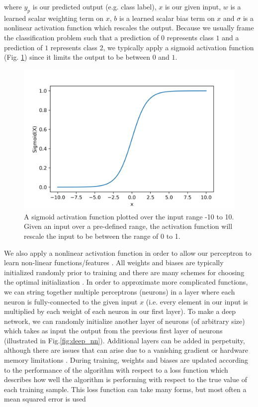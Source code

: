 where $y_{p}$ is our predicted output (e.g. class label), $x$ is our given input, $w$ is a learned scalar weighting term on $x$, $b$ is a learned scalar bias term on $x$ and $\sigma$ is a nonlinear activation function which rescales the output. Because we usually frame the classification problem such that a prediction of $0$ represents class $1$ and a prediction of $1$ represents class $2$, we typically apply a sigmoid activation function (Fig. \ref{fig:sigmoid}) since it limits the output to be between $0$ and $1$.

\begin{figure}
    \centering
    \includegraphics[width=\linewidth]{figures/sigmoid_function.png}
    \caption[Sigmoid activation function illustration.]{A sigmoid activation function plotted over the input 
    range -10 to 10. Given an input over a pre-defined range, the 
    activation function will rescale the input to be between the range 
    of 0 to 1.}
    \label{fig:sigmoid}
\end{figure}

We also apply a nonlinear activation function in order to allow our perceptron to learn non-linear functions/features \cite{1811.03378}. All weights and biases are typically initialized randomly prior to training and there are many schemes for choosing the optimal initialization \cite{1704.08863}. In order to approximate more complicated functions, we can string together multiple perceptrons (neurons) in a layer where each neuron is fully-connected to the given input $x$ (i.e. every element in our input is multiplied by each weight of each neuron in our first layer)\cite{Goodfellow-et-al-2016}. To make a deep network, we can randomly initialize another layer of neurons (of arbitrary size) which takes as input the output from the previous first layer of neurons (illustrated in Fig.\ref{fig:deep_nn}). Additional layers can be added in perpetuity, although there are issues that can arise due to a vanishing gradient or hardware memory limitations \cite{1211.5063}. During training, weights and biases are updated according to the performance of the algorithm with respect to a loss function which describes how well the algorithm is performing with respect to the true value of each training sample\cite{1702.05659}. This loss function can take many forms, but most often a mean squared error is used

